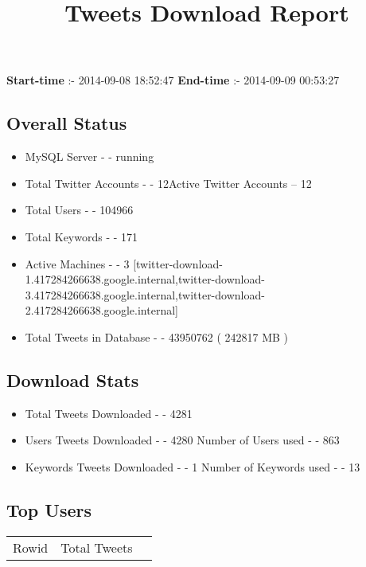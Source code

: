 \documentclass{article}\usepackage[T1]{fontenc}
\begin{document}
\title{\textbf{Tweets Download Report}}
               \date{}
                \maketitle
               \centerline{\textbf{Start-time} :- 2014-09-08 18:52:47 \hspace{40pt} \textbf{End-time} :- 2014-09-09 00:53:27}               \subsection*{Overall Status}                \begin{itemize}                \item MySQL Server - - running               \item Total Twitter Accounts - - 12\newline Active Twitter Accounts -- 12               \item Total Users - - 104966               \item Total Keywords - - 171               \item Active Machines - - 3 [twitter-download-1.417284266638.google.internal,twitter-download-3.417284266638.google.internal,twitter-download-2.417284266638.google.internal]               \item Total Tweets in Database - - 43950762 ( 242817 MB )               \end{itemize}               \subsection*{Download Stats}                \begin{itemize}                \item Total Tweets Downloaded - - 4281               \item Users Tweets Downloaded - - 4280 \newline Number of Users used - - 863               \item Keywords Tweets Downloaded - - 1 \newline Number of Keywords used - - 13              \end{itemize}              \subsection*{Top Users}\begin{tabular}{|c|c|c|}         \hline         Rowid & Total Tweets \\ 

\end{tabular}
\end{document}
